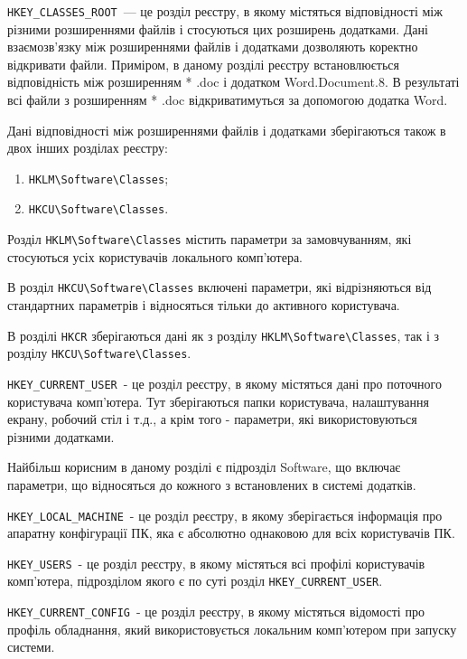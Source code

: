 \documentclass[
	a4paper,
	oneside,
	DIV = 12,
	fontsize = 13pt,
	headings = normal,
]{scrartcl}
\newcommand{\regkey}[1]{\texttt{\textenglish{#1}}}
\begin{document}
		\regkey{HKEY\_CLASSES\_ROOT}~— це розділ реєстру, в якому містяться відповідності між різними розширеннями файлів і стосуються цих розширень додатками. Дані взаємозв'язку між розширеннями файлів і додатками дозволяють коректно відкривати файли. Приміром, в даному розділі реєстру встановлюється відповідність між розширенням * .doc і додатком Word.Document.8. В результаті всі файли з розширенням * .doc відкриватимуться за допомогою додатка Word. 

		Дані відповідності між розширеннями файлів і додатками зберігаються також в двох інших розділах реєстру: 
		\begin{enumerate}
			\item \regkey{HKLM\textbackslash{}\-Software\textbackslash{}\-Classes};
			\item \regkey{HKCU\textbackslash{}\-Software\textbackslash{}\-Classes}.
		\end{enumerate}

		Розділ \regkey{HKLM\textbackslash{}\-Software\textbackslash{}\-Classes} містить параметри за замовчуванням, які стосуються усіх користувачів локального комп'ютера. 

		В розділ  \regkey{HKCU\textbackslash{}\-Software\textbackslash{}\-Classes} включені параметри, які відрізняються від стандартних параметрів і відносяться тільки до активного користувача. 

		В розділі \regkey{HKCR} зберігаються дані як з розділу \regkey{HKLM\textbackslash{}\-Software\textbackslash{}\-Classes}, так і з розділу \regkey{HKCU\textbackslash{}\-Software\textbackslash{}\-Classes}. 

		\regkey{HKEY\_CURRENT\_USER}~- це розділ реєстру, в якому містяться дані про поточного користувача комп'ютера. Тут зберігаються папки користувача, налаштування екрану, робочий стіл і т.д., а крім того - параметри, які використовуються різними додатками. 

		Найбільш корисним в даному розділі є підрозділ Software, що включає параметри, що відносяться до кожного з встановлених в системі додатків. 

		\regkey{HKEY\_LOCAL\_MACHINE}~- це розділ реєстру, в якому зберігається інформація про апаратну конфігурації ПК, яка є абсолютно однаковою для всіх користувачів ПК. 

		\regkey{HKEY\_USERS}~- це розділ реєстру, в якому містяться всі профілі користувачів комп'ютера, підрозділом якого є по суті розділ \regkey{HKEY\_CURRENT\_USER}. 

		\regkey{HKEY\_CURRENT\_CONFIG}~- це розділ реєстру, в якому містяться відомості про профіль обладнання, який використовується локальним комп'ютером при запуску системи.
\end{document}
